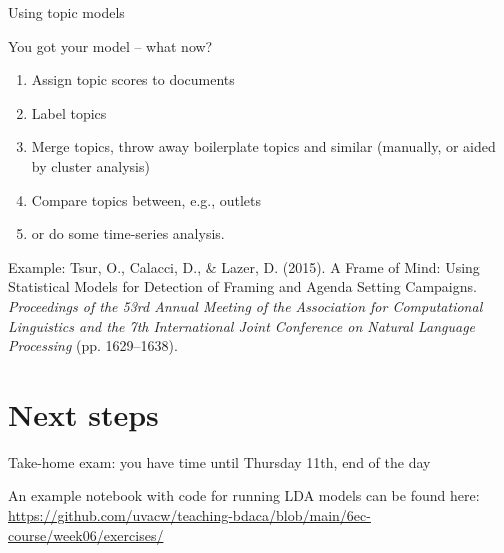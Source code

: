 \begin{frame}{Using topic models}
	
You got your model -- what now?
	
	\begin{enumerate}
		\item Assign topic scores to documents
		\item Label topics
		\item Merge topics, throw away boilerplate topics and similar (manually, or aided by cluster analysis)
		\item Compare topics between, e.g., outlets
		\item or do some time-series analysis.
	\end{enumerate}
	
	
	Example:
	\tiny{Tsur, O., Calacci, D., \& Lazer, D. (2015). A Frame of Mind: Using Statistical Models for Detection of Framing and Agenda Setting Campaigns. \textit{Proceedings of the 53rd Annual Meeting of the Association for Computational Linguistics and the 7th International Joint Conference on Natural Language Processing} (pp. 1629–1638).}
	
\end{frame}




\section{Next steps}

\begin{frame}[standout]
Take-home exam: you have time until Thursday 11th, end of the day

An example notebook with code for running LDA models can be found here:
\large{\url{https://github.com/uvacw/teaching-bdaca/blob/main/6ec-course/week06/exercises/}}
\end{frame}



\begin{frame}
	\printbibliography
\end{frame}




